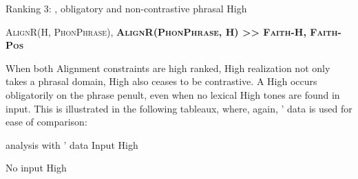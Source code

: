 \documentclass[output=paper
,newtxmath
,modfonts
,nonflat]{langsci/langscibook}
\begin{document}
\ea\label{ex:downing:23} Ranking 3: , obligatory and non-contrastive phrasal High 

\textsc{AlignR(H, PhonPhrase}), \textbf{\textsc{AlignR(PhonPhrase, H}}\textbf{) \textsc{>> Faith-H, Faith-Pos}}
\z

When both Alignment constraints are high ranked, High  realization not only takes a phrasal domain, High  also ceases to be contrastive. A High  occurs obligatorily on the phrase penult, even when no lexical High tones are found in input. This is illustrated in the following tableaux, where, again, ’ data is used for ease of comparison:

\begin{comment} 
\ea 
 \gll \\
   \\
 \glt
\z
\end{comment}

\ea\label{ex:downing:24}   analysis with ’ data
\ea\label{ex:downing:24a} Input High 

\sn
\ex\label{ex:downing:24b} No input High 
\sn
{}
\z
\z
\end{document}

